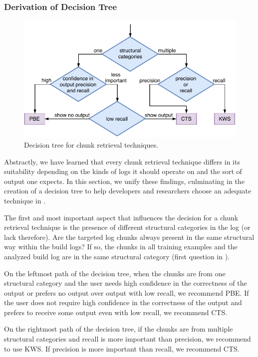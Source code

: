 \subsubsection{Derivation of Decision Tree}
\begin{figure}[bt]
		\centering
		\includegraphics[width=\columnwidth,
		clip]{img/crt-recommendation.pdf}
		\caption{Decision tree for chunk
		retrieval techniques.}
		\label{fig:crt-recommendation}
\end{figure}

Abstractly, we have learned that every chunk retrieval technique
differs in its suitability depending on the kinds of logs it should
operate on and the sort of output one expects.
In this section, we
unify these findings, culminating in the creation of a decision tree
to help developers and researchers choose an adequate technique in
.

The first and most important aspect that influences the decision for a
chunk retrieval technique is the presence of different structural
categories in the log (or lack therefore).
Are the targeted log
chunks always present in the same structural way
within the build logs? If so, the chunks
in all training examples and the analyzed build log are in the same
structural category (first question in ).

On the leftmost path of the decision tree,
when the chunks are from one structural category and the user
needs high confidence in the correctness of the output or prefers
no output over output with low recall, we recommend PBE\@.
If the user does not
require high confidence in the correctness of the output and prefers
to receive some output even with low recall, we recommend CTS\@.

On the rightmost path of the decision tree,
if the chunks are from multiple structural categories and recall is
more important than precision, we recommend to use KWS\@.
If precision is more important than recall, we
recommend CTS\@.

